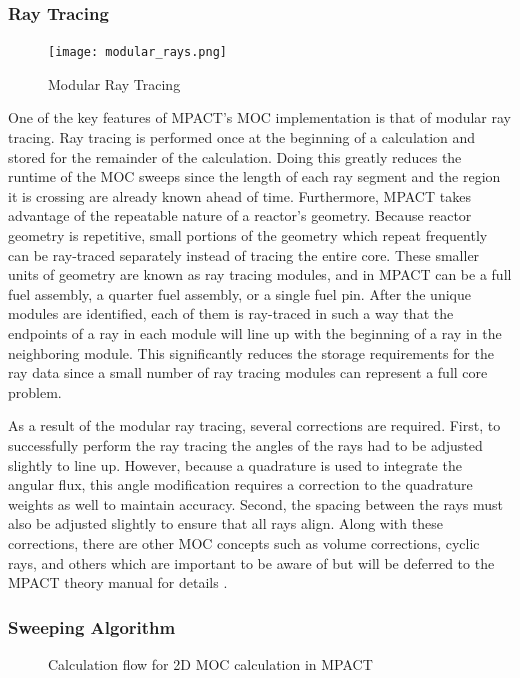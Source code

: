 \subsubsection{Ray Tracing}

\begin{figure}[h]
    \texttt{[image: modular\_rays.png]}
    \caption{Modular Ray Tracing}\label{e:ModRays}
\end{figure}

One of the key features of MPACT's MOC implementation is that of modular ray tracing.  Ray tracing is performed once at the beginning of a calculation and stored for the remainder of the calculation.  Doing this greatly reduces the runtime of the MOC sweeps since the length of each ray segment and the region it is crossing are already known ahead of time.  Furthermore, MPACT takes advantage of the repeatable nature of a reactor's geometry.  Because reactor geometry is repetitive, small portions of the geometry which repeat frequently can be ray-traced separately instead of tracing the entire core.  These smaller units of geometry are known as ray tracing modules, and in MPACT can be a full fuel assembly, a quarter fuel assembly, or a single fuel pin.  After the unique modules are identified, each of them is ray-traced in such a way that the endpoints of a ray in each module will line up with the beginning of a ray in the neighboring module.  This significantly reduces the storage requirements for the ray data since a small number of ray tracing modules can represent a full core problem.

As a result of the modular ray tracing, several corrections are required.  First, to successfully perform the ray tracing the angles of the rays had to be adjusted slightly to line up.  However, because a quadrature is used to integrate the angular flux, this angle modification requires a correction to the quadrature weights as well to maintain accuracy.  Second, the spacing between the rays must also be adjusted slightly to ensure that all rays align.  Along with these corrections, there are other MOC concepts such as volume corrections, cyclic rays, and others which are important to be aware of but will be deferred to the MPACT theory manual for details \cite{MPACTTheoryManual}.

\subsubsection{Sweeping Algorithm}

\begin{figure}[h]
  \centering
  
  \caption{Calculation flow for 2D MOC calculation in MPACT}\label{f:MOC-flowchart}
\end{figure}

